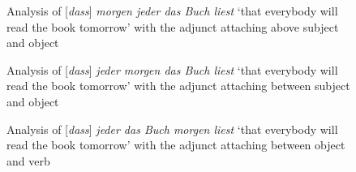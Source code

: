\begin{figure}

\caption{\label{fig-m-j-b-l}Analysis of [\emph{dass}] \emph{morgen jeder das Buch liest} `that everybody will read the
  book tomorrow' with the adjunct attaching above subject and object}
\end{figure}


\begin{figure}

\caption{\label{fig-j-m-b-l}Analysis of [\emph{dass}] \emph{jeder morgen das Buch liest} `that everybody will read the
  book tomorrow' with the adjunct attaching between subject and object}
\end{figure}


\begin{figure}
\caption{\label{fig-j-b-m-l}Analysis of [\emph{dass}] \emph{jeder das Buch morgen liest} `that everybody will read the
  book tomorrow' with the adjunct attaching between object and verb}
\end{figure}

